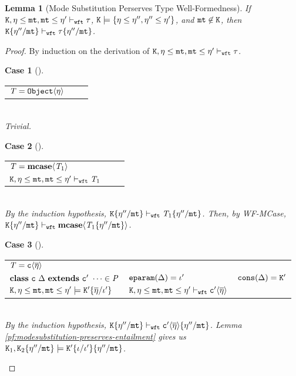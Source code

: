 \documentclass[onecolumn,nocopyrightspace]{sigplanconf}
\newtheorem{lemma}{Lemma}
\theoremstyle{lessintrusive}
\theoremstyle{plain}
\theoremstyle{custom}
\newtheorem*{case}{Case}
\theoremstyle{subcase-custom}
\begin{document}
\begin{lemma}[Mode Substitution Perserves Type Well-Formedness]
\label{pf:modesubstitution-preserves-wellformedness}
If $\mathtt{K},\eta\leq\mathtt{mt},\mathtt{mt}\leq\eta' \vdash_{\tt wft} \tau$, $\mathtt{K}\models\{\eta\leq\eta'',\eta''\leq\eta'\}$, and $\mathtt{mt} \not\in \mathtt{K}$, then $\mathtt{K}\{\eta''/\mathtt{mt}\} \vdash_{\tt wft} \tau\{\eta''/\mathtt{mt}\}$.
\end{lemma}
\begin{proof}
By induction on the derivation of $\mathtt{K},\eta\leq\mathtt{mt},\mathtt{mt}\leq\eta' \vdash_{\tt wft} \tau$.

\begin{case}[]
\begin{tabular}[t]{>{$}l<{$} >{$}l<{$} >{$}l<{$}}
\bt = \Nobject\lb\basemode\rb & & \\
\end{tabular}\\ 
Trivial.
\end{case}

\begin{case}[] 
\begin{tabular}[t]{>{$}l<{$} >{$}l<{$} >{$}l<{$}}
\bt = \tmcase{\bt_1} & & \\
\cset,\basemode\msub\mtvar,\mtvar\msub\basemode' \judgewft \bt_1 & & \\
\end{tabular}\\ 
By the induction hypothesis, $\cset\subst{\mtvar}{\basemode''}\judgewft\bt_1\subst{\mtvar}{\basemode''}$. Then, by WF-MCase, $\cset\subst{\mtvar}{\basemode''}\judgewft \tmcase{\bt_1\subst{\mtvar}{\basemode''}}$.
\end{case}

\begin{case}[] 
\begin{tabular}[t]{>{$}l<{$} >{$}l<{$} >{$}l<{$}}
\bt = \Cname\lb\overline{\basemode}\rb & & \\
\kwclass\ \Cname\ \tspec\ \kwextends\ \Dname\ \dots \in \programcode & \Feparam(\tspec) = \listi' & \Fcons(\tspec) = \cset' \\
\cset,\basemode\msub\mtvar,\mtvar\msub\basemode'\models\cset'\subst{\listi'}{\overline{\basemode}} & \cset,\basemode\msub\mtvar,\mtvar\msub\basemode'\judgewft\Dname\lb\overline{\basemode}\rb & \\ 
\end{tabular}\\
By the induction hypothesis, $\cset\subst{\mtvar}{\basemode''}\judgewft\Dname\lb\overline{\basemode}\rb\subst{\mtvar}{\basemode''}$. Lemma \ref{pf:modesubstitution-preserves-entailment} gives us $\cset_1,\cset_2\subst{\mtvar}{\basemode''}\models\cset'\subst{\listi'}{\listi}\subst{\mtvar}{\basemode''}$.


\end{case}
\end{proof}
\end{document}
